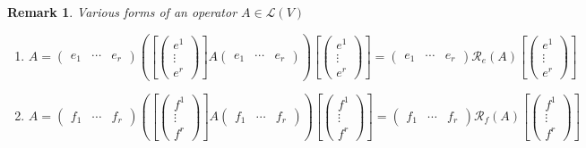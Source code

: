 \documentclass[aps,preprint]{revtex4}
\newtheorem{remark}[theorem]{Remark}
\begin{document}
\begin{remark}
Various forms of an operator $A\in \mathcal{L}\left( V\right) $

\begin{enumerate}
\item 
\begin{equation}
A=\left( 
\begin{array}{ccc}
e_{1} & \cdots & e_{r}%
\end{array}%
\right) \left( \overset{}{\left[ \left( 
\begin{array}{c}
e^{1} \\ 
\vdots \\ 
e^{r}%
\end{array}%
\right) \right] A\left( 
\begin{array}{ccc}
e_{1} & \cdots & e_{r}%
\end{array}%
\right) }\right) \left[ \left( 
\begin{array}{c}
e^{1} \\ 
\vdots \\ 
e^{r}%
\end{array}%
\right) \right] =\left( 
\begin{array}{ccc}
e_{1} & \cdots & e_{r}%
\end{array}%
\right) \mathcal{R}_{e}\left( A\right) \left[ \left( 
\begin{array}{c}
e^{1} \\ 
\vdots \\ 
e^{r}%
\end{array}%
\right) \right]
\end{equation}

\item 
\begin{equation}
A=\left( 
\begin{array}{ccc}
f_{1} & \cdots & f_{r}%
\end{array}%
\right) \left( \left[ \left( 
\begin{array}{c}
f^{1} \\ 
\vdots \\ 
f^{r}%
\end{array}%
\right) \right] A\left( 
\begin{array}{ccc}
f_{1} & \cdots & f_{r}%
\end{array}%
\right) \right) \left[ \left( 
\begin{array}{c}
f^{1} \\ 
\vdots \\ 
f^{r}%
\end{array}%
\right) \right] =\left( 
\begin{array}{ccc}
f_{1} & \cdots & f_{r}%
\end{array}%
\right) \mathcal{R}_{f}\left( A\right) \left[ \left( 
\begin{array}{c}
f^{1} \\ 
\vdots \\ 
f^{r}%
\end{array}%
\right) \right]
\end{equation}


\end{enumerate}
\end{remark}
\end{document}
